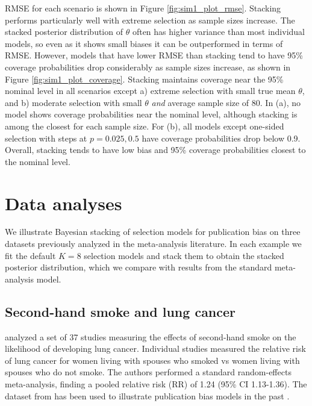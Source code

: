 \documentclass[12pt]{article}   	%
\numberwithin{equation}{section}
\begin{document}
RMSE for each scenario is shown in Figure \ref{fig:sim1_plot_rmse}. Stacking performs particularly well with extreme selection as sample sizes increase. The stacked posterior distribution of $\theta$ often has higher variance than most individual models, so even as it shows small biases it can be outperformed in terms of RMSE. However, models that have lower RMSE than stacking tend to have 95\% coverage probabilities drop considerably as sample sizes increase, as shown in Figure \ref{fig:sim1_plot_coverage}. Stacking maintains coverage near the 95\% nominal level in all scenarios except a) extreme selection with small true mean $\theta$, and b) moderate selection with small $\theta$ \textit{and} average sample size of 80. In (a), no model shows coverage probabilities near the nominal level, although stacking is among the closest for each sample size. For (b), all models except one-sided selection with steps at $p = 0.025, 0.5$ have coverage probabilities drop below 0.9. Overall, stacking tends to have low bias and 95\% coverage probabilities closest to the nominal level.

\section{Data analyses} \label{sec:numex}

We illustrate Bayesian stacking of selection models for publication bias on three datasets previously analyzed in the meta-analysis literature. In each example we fit the default $K=8$ selection models and stack them to obtain the stacked posterior distribution, which we compare with results from the standard meta-analysis model. 

\subsection{Second-hand smoke and lung cancer}

\citet{hackshaw1997} analyzed a set of 37 studies measuring the effects of second-hand smoke on the likelihood of developing lung cancer. Individual studies measured the relative risk of lung cancer for women living with spouses who smoked vs women living with spouses who do not smoke. The authors performed a standard random-effects meta-analysis, finding a pooled relative risk (RR) of 1.24 (95\% CI 1.13-1.36). The dataset from \citet{hackshaw1997} has been used to illustrate publication bias models in the past \citep{sterne2005funnel, ning2017copas, takagi2006hackshaw}.
\end{document}

